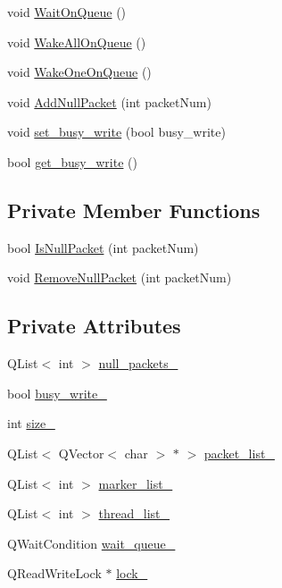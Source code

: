 \begin{DoxyCompactItemize}
void \hyperlink{classGRIBuffer_ad53e55d7d8c28900a20551e93a660d1e}{\-Wait\-On\-Queue} ()
\item 
void \hyperlink{classGRIBuffer_a60f06c84763dfe59e00a20cbffde9c5e}{\-Wake\-All\-On\-Queue} ()
\item 
void \hyperlink{classGRIBuffer_a8a081223881266d3fac59476b5a25f2b}{\-Wake\-One\-On\-Queue} ()
\item 
void \hyperlink{classGRIBuffer_a3ddc5961489db26cb4e354ef12f178a3}{\-Add\-Null\-Packet} (int packet\-Num)
\item 
void \hyperlink{classGRIBuffer_a2123cc7f718d0939e1b92312958b1c26}{set\-\_\-busy\-\_\-write} (bool busy\-\_\-write)
\item 
bool \hyperlink{classGRIBuffer_af9fd32214c59e233d22eb128bfc45a06}{get\-\_\-busy\-\_\-write} ()
\end{DoxyCompactItemize}
\subsection*{\-Private \-Member \-Functions}
\begin{DoxyCompactItemize}
\item 
bool \hyperlink{classGRIBuffer_a7058e04cd8dccc48cfcd8cbd83825664}{\-Is\-Null\-Packet} (int packet\-Num)
\item 
void \hyperlink{classGRIBuffer_ad62e30cbc12faa67a571353294c8f538}{\-Remove\-Null\-Packet} (int packet\-Num)
\end{DoxyCompactItemize}
\subsection*{\-Private \-Attributes}
\begin{DoxyCompactItemize}
\item 
\-Q\-List$<$ int $>$ \hyperlink{classGRIBuffer_ada16ddba855cc922f2e8227205ab2e26}{null\-\_\-packets\-\_\-}
\item 
bool \hyperlink{classGRIBuffer_a7c9dc9b15635fdfb044ae63273664dd2}{busy\-\_\-write\-\_\-}
\item 
int \hyperlink{classGRIBuffer_a1c470491db373e112eb96a45b09ac12d}{size\-\_\-}
\item 
\-Q\-List$<$ \-Q\-Vector$<$ char $>$ $\ast$ $>$ \hyperlink{classGRIBuffer_a47531e513e5783b3739c9ea857b8c229}{packet\-\_\-list\-\_\-}
\item 
\-Q\-List$<$ int $>$ \hyperlink{classGRIBuffer_af3360239e8142200e4011ee51ac9d113}{marker\-\_\-list\-\_\-}
\item 
\-Q\-List$<$ int $>$ \hyperlink{classGRIBuffer_aa0d22b7b8351092286eef843913e38b8}{thread\-\_\-list\-\_\-}
\item 
\-Q\-Wait\-Condition \hyperlink{classGRIBuffer_acc7e6856998c0ad94da57a0b58f66438}{wait\-\_\-queue\-\_\-}
\item 
\-Q\-Read\-Write\-Lock $\ast$ \hyperlink{classGRIBuffer_a781cc2011649ec15ff88281420c98110}{lock\-\_\-}
\end{DoxyCompactItemize}


